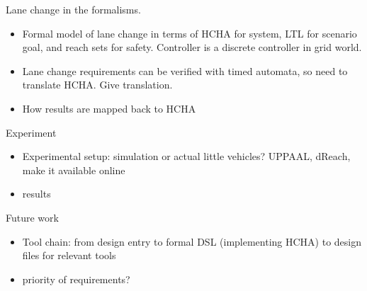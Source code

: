 Lane change in the formalisms.
\begin{itemize}	
	\item Formal model of lane change in terms of HCHA for system, LTL for scenario goal, and reach sets for safety. Controller is a discrete controller in grid world.
	
	\item Lane change requirements can be verified with timed automata, so need to translate HCHA. Give translation.
	
	\item How results are mapped back to HCHA
	
\end{itemize}


Experiment
\begin{itemize}
	\item Experimental setup: simulation or actual little vehicles? UPPAAL, dReach, make it available online
	
	\item results
	
\end{itemize}

Future work
\begin{itemize}
	\item Tool chain: from design entry to formal DSL (implementing HCHA) to design files for relevant tools
	\item priority of requirements?
\end{itemize}